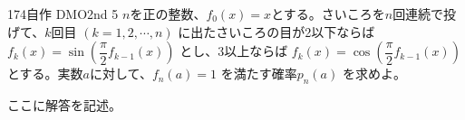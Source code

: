 \begin{prob}{174}{}{自作 DMO2nd 5}
 $n$を正の整数、$f_0(x)=x$とする。さいころを$n$回連続で投げて、$k$回目 $(k=1, 2, \cdots, n)$ に出たさいころの目が2以下ならば $f_k(x)=\sin \left(\dfrac{\pi}{2}f_{k-1}(x)\right)$ とし、3以上ならば $f_k(x)=\cos\left(\dfrac{\pi}{2}f_{k-1}(x)\right)$ とする。実数$a$に対して、$f_n(a)=1$ を満たす確率$p_n(a)$ を求めよ。
\end{prob}
ここに解答を記述。